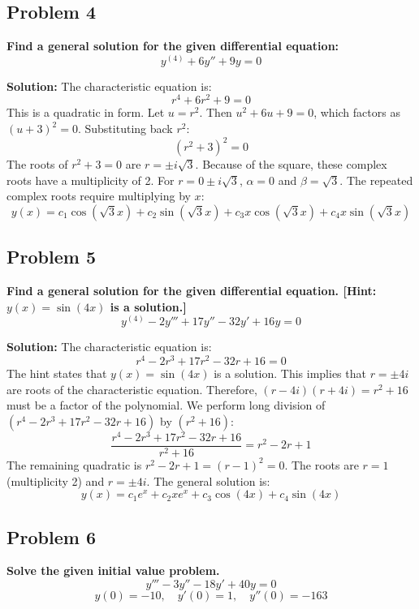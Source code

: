 \documentclass[11pt, a4paper]{article}
\theoremstyle{definition}
\theoremstyle{remark}
\begin{document}
\subsection*{Problem 4}
\textbf{Find a general solution for the given differential equation:}
\[ y^{(4)} + 6y'' + 9y = 0 \]

\textbf{Solution:}
The characteristic equation is:
\[ r^4 + 6r^2 + 9 = 0 \]
This is a quadratic in form. Let $u = r^2$. Then $u^2 + 6u + 9 = 0$, which factors as $(u + 3)^2 = 0$. Substituting back $r^2$:
\[ (r^2 + 3)^2 = 0 \]
The roots of $r^2 + 3 = 0$ are $r = \pm i\sqrt{3}$. Because of the square, these complex roots have a multiplicity of 2. 
For $r = 0 \pm i\sqrt{3}$, $\alpha = 0$ and $\beta = \sqrt{3}$. The repeated complex roots require multiplying by $x$:
\[ y(x) = c_1 \cos(\sqrt{3}x) + c_2 \sin(\sqrt{3}x) + c_3 x \cos(\sqrt{3}x) + c_4 x \sin(\sqrt{3}x) \]

\subsection*{Problem 5}
\textbf{Find a general solution for the given differential equation. [Hint: $y(x) = \sin(4x)$ is a solution.]}
\[ y^{(4)} - 2y''' + 17y'' - 32y' + 16y = 0 \]

\textbf{Solution:}
The characteristic equation is:
\[ r^4 - 2r^3 + 17r^2 - 32r + 16 = 0 \]
The hint states that $y(x) = \sin(4x)$ is a solution. This implies that $r = \pm 4i$ are roots of the characteristic equation. Therefore, $(r - 4i)(r + 4i) = r^2 + 16$ must be a factor of the polynomial.
We perform long division of $(r^4 - 2r^3 + 17r^2 - 32r + 16)$ by $(r^2 + 16)$:
\[ \frac{r^4 - 2r^3 + 17r^2 - 32r + 16}{r^2 + 16} = r^2 - 2r + 1 \]
The remaining quadratic is $r^2 - 2r + 1 = (r - 1)^2 = 0$.
The roots are $r = 1$ (multiplicity 2) and $r = \pm 4i$. The general solution is:
\[ y(x) = c_1 e^x + c_2 x e^x + c_3 \cos(4x) + c_4 \sin(4x) \]

\subsection*{Problem 6}
\textbf{Solve the given initial value problem.}
\[ y''' - 3y'' - 18y' + 40y = 0 \]
\[ y(0) = -10, \quad y'(0) = 1, \quad y''(0) = -163 \]
\end{document}
